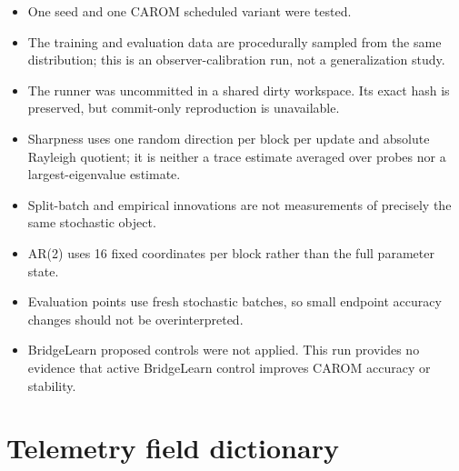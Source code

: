 \documentclass[10pt,letterpaper]{article}
\begin{document}
\begin{itemize}
\item One seed and one CAROM scheduled variant were tested.
\item The training and evaluation data are procedurally sampled from the same
distribution; this is an observer-calibration run, not a generalization study.
\item The runner was uncommitted in a shared dirty workspace.  Its exact hash
is preserved, but commit-only reproduction is unavailable.
\item Sharpness uses one random direction per block per update and absolute
Rayleigh quotient; it is neither a trace estimate averaged over probes nor a
largest-eigenvalue estimate.
\item Split-batch and empirical innovations are not measurements of precisely
the same stochastic object.
\item AR(2) uses 16 fixed coordinates per block rather than the full parameter
state.
\item Evaluation points use fresh stochastic batches, so small endpoint
accuracy changes should not be overinterpreted.
\item BridgeLearn proposed controls were not applied.  This run provides no
evidence that active BridgeLearn control improves CAROM accuracy or stability.
\end{itemize}

\section{Telemetry field dictionary}
\end{document}
